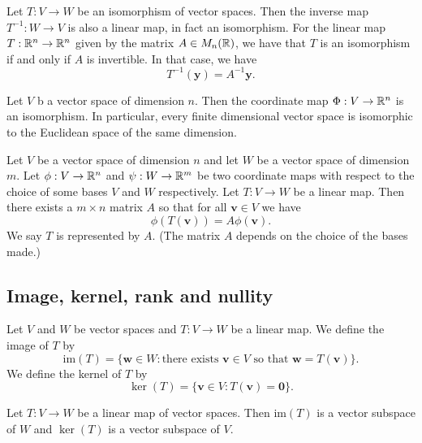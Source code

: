 \documentclass[10pt, a4paper]{article}
\newcommand{\mbf}[1]{\mathbf{#1}}
\begin{document}
\begin{lemma}
    Let $T : V \rightarrow W$ be an isomorphism of vector spaces.
    Then the inverse map $T ^ {-1} : W \rightarrow V$ is also a linear map,
    in fact an isomorphism.
    For the linear map $T : \mathbb{R} ^ n \rightarrow \mathbb{R} ^ n$ given by the matrix $A \in M_n(\mathbb{R})$,
    we have that $T$ is an isomorphism if and only if $A$ is invertible.
    In that case,
    we have
    \[
    T ^ {-1}(\mbf{y}) = A ^ {-1}\mbf{y}.
    \]
\end{lemma}

\begin{lemma}
    Let $V$ b a vector space of dimension $n$.
    Then the coordinate map $\Phi : V \rightarrow \mathbb{R} ^ n$ is an isomorphism.
    In particular,
    every finite dimensional vector space is isomorphic to the Euclidean space of the same dimension.
\end{lemma}

\begin{theorem}
    Let $V$ be a vector space of dimension $n$ and let $W$ be a vector space of dimension $m$.
    Let $\phi : V \rightarrow \mathbb{R} ^ n$ and $\psi : W \rightarrow \mathbb{R} ^ m$ be two coordinate maps with respect to the choice of some bases $V$ and $W$ respectively.
    Let $T : V \rightarrow W$ be a linear map.
    Then there exists a $m \times n$ matrix $A$ so that for all $\mbf{v} \in V$ we have
    \[
    \phi(T(\mbf{v})) = A\phi(\mbf{v}).
    \]
    We say $T$ is represented by $A$.
    (The matrix $A$ depends on the choice of the bases made.)
\end{theorem}

\subsection{Image, kernel, rank and nullity}
\begin{definition}
    Let $V$ and $W$ be vector spaces and $T : V \rightarrow W$ be a linear map.
    We define the image of $T$ by
    \[
    \mathrm{im}(T) = \{\mbf{w} \in W : \text{there exists $\mbf{v} \in V$ so that } \mbf{w} = T(\mbf{v})\}.
    \]
    We define the kernel of $T$ by
    \[
    \ker(T) = \{\mbf{v} \in V : T(\mbf{v}) = \mbf{0}\}.
    \]
\end{definition}

\begin{lemma}
    Let $T : V \rightarrow W$ be a linear map of vector spaces.
    Then $\mathrm{im}(T)$ is a vector subspace of $W$ and $\ker(T)$ is a vector subspace of $V$.
\end{lemma}
\end{document}
